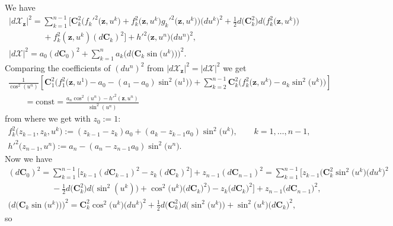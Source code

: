 \documentclass[pdftex]{sigma}
\begin{document}
We have
\begin{gather*}
|d\mathcal{X}_{\mathbf{z}}|^2=\sum_{k=1}^{n-1}\big[\mathbf{C}_k^2\big(f_k'^2\big(\mathbf{z},u^k\big)
+f_k^2\big(\mathbf{z},u^k\big)g_k'^2\big(\mathbf{z},u^k\big)\big)\big(du^k\big)^2
+\tfrac{1}{2}d\big(\mathbf{C}_k^2\big)d\big(f_k^2\big(\mathbf{z},u^k\big)\big)
\\
\phantom{|d\mathcal{X}_{\mathbf{z}}|^2=}{}
+f_k^2(\mathbf{z},u^k)(d\mathbf{C}_k)^2\big]
+h'^2\big(\mathbf{z},u^n\big)\big(du^n\big)^2,\\
|d\mathcal{X}|^2=a_0(d\mathbf{C}_0)^2
+\sum_{k=1}^na_k\big(d\big(\mathbf{C}_k\sin\big(u^k\big)\big)\big)^2.
\end{gather*}
Comparing the coef\/f\/icients of $(du^n)^2$ from
$|d\mathcal{X}_{\mathbf{z}}|^2=|d\mathcal{X}|^2$ we get
\begin{gather*}
\frac{1}{\cos^2(u^n)}\left[\mathbf{C}_1^2\big(f_1^2\big(\mathbf{z},u^1\big)-a_0-(a_1-a_0)\sin^2\big(u^1\big)\big)+
\sum_{k=2}^{n-1}\mathbf{C}_k^2\big(f_k^2\big(\mathbf{z},u^k\big)-a_k\sin^2\big(u^k\big)\big)\right]
\\
\qquad {}=\mathrm{const}=\frac{a_n\cos^2(u^n)-h'^2(\mathbf{z},u^n)}{\sin^2(u^n)}
\end{gather*}
from where we get with $z_0:=1$:
\begin{gather*}
f_k^2\big(z_{k-1},z_k,u^k\big):=(z_{k-1}-z_k)a_0+(a_k-z_{k-1}a_0)\sin^2\big(u^k\big),\qquad
k=1,\dots ,n-1,
\\
h'^2\big(z_{n-1},u^n\big):=a_n-(a_n-z_{n-1}a_0)\sin^2\big(u^n\big).
\end{gather*}
Now we have
\begin{gather*}
(d\mathbf{C}_0)^2=\sum_{k=1}^{n-1}\big[z_{k-1}(d\mathbf{C}_{k-1})^2-z_k(d\mathbf{C}_k)^2\big]
+z_{n-1}(d\mathbf{C}_{n-1})^2=\sum_{k=1}^{n-1}\!\big[z_{k-1} \big(\mathbf{C}_k^2\sin^2\big(u^k\big)\big(du^k\big)^2
\\
\phantom{(d\mathbf{C}_0)^2=}{}
-\tfrac{1}{2}d\big(\mathbf{C}_k^2\big)d\big(\sin^2(u^k)\big)+\cos^2\big(u^k\big)\big(d\mathbf{C}_k\big)^2\big)
-z_k\big(d\mathbf{C}_k\big)^2\big] +z_{n-1}\big(d\mathbf{C}_{n-1}\big)^2,
\\
\big(d\big(\mathbf{C}_k\sin\big(u^k\big)\big)\big)^2=\mathbf{C}_k^2\cos^2\big(u^k\big)\big(du^k\big)^2
+\tfrac{1}{2}d\big(\mathbf{C}_k^2\big)d\big(\sin^2\big(u^k\big)\big)+\sin^2\big(u^k\big)\big(d\mathbf{C}_k\big)^2,
\end{gather*}
so
\end{document}
